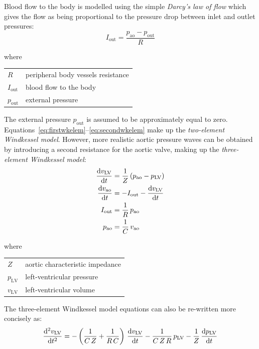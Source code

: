 \vspace{0.5cm}
\noindent
Blood flow to the body is modelled using the simple \textit{Darcy's law of flow} which gives the flow as being proportional to the pressure drop between inlet and outlet pressures:
%
\begin{equation}\label{eq:secondwkelem}
    I_{\textrm{out}} = \frac{p_{\textrm{ao}}-p_{\textrm{out}}}{R} 
\end{equation}

\noindent
where

\vspace{0.2cm}
\begin{tabular}{ll}
    $R$ & peripheral body vessels resistance \\
    $I_{\textrm{out}}$ & blood flow to the body \\
    $p_{\textrm{out}}$ & external pressure \\
\end{tabular}

\vspace{0.5cm}
\noindent
The external pressure $p_{\textrm{out}}$ is assumed to be approximately equal to zero. Equations~\eqref{eq:firstwkelem}--\eqref{eq:secondwkelem} make up the \textit{two-element Windkessel model}. However, more realistic aortic pressure waves can be obtained by introducing a second resistance for the aortic valve, making up the \textit{three-element Windkessel model}:
%
\begin{align}\label{eq:windk}
    \dfrac{\mathrm{d}{v_{\textrm{LV}}}}{\mathrm{d}{t}} &= \frac{1}{Z}\,(p_{\textrm{ao}}-p_{\textrm{LV}}) \\ 
    \dfrac{\mathrm{d}{v_{\textrm{ao}}}}{\mathrm{d}{t}} &= -I_{\textrm{out}}-\dfrac{\mathrm{d}{v_{\textrm{LV}}}}{\mathrm{d}{t}} \\
    I_{\textrm{out}} &= \frac{1}{R}\,p_{\textrm{ao}} \\
    p_{\textrm{ao}} &= \frac{1}{C}\,v_{\textrm{ao}}
\end{align}

\noindent
where

\vspace{0.2cm}
\begin{tabular}{ll}
    $Z$ & aortic characteristic impedance \\
    $p_{\textrm{LV}}$ & left-ventricular pressure \\
    $v_{\textrm{LV}}$ & left-ventricular volume
\end{tabular}

\vspace{0.5cm}
\noindent
The three-element Windkessel model equations can also be re-written more concisely as:
%
\begin{equation}\label{eq:windkconcise}
    \dfrac{\mathrm{d}^2{v_{\textrm{LV}}}}{\mathrm{d}{t}^2} = -\left(\frac{1}{C\,Z}+\frac{1}{R\,C}\right)\,\dfrac{\mathrm{d}{v_{\textrm{LV}}}}{\mathrm{d}{t}}-\frac{1}{C\,Z\,R}\,p_{\textrm{LV}}-\frac{1}{Z}\,\dfrac{\mathrm{d}{p_{\textrm{LV}}}}{\mathrm{d}{t}}
\end{equation}

